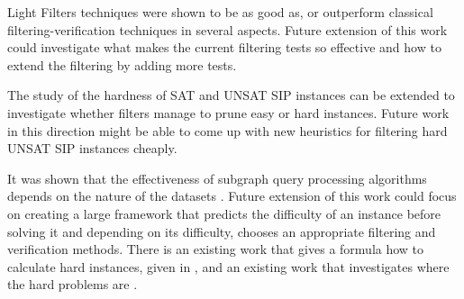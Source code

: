 \documentclass{l4proj}
\begin{document}
Light Filters techniques were shown to be as good as, or outperform classical filtering-verification techniques in several aspects. Future extension of this work could investigate what makes the current filtering tests so effective and how to extend the filtering by adding more tests.

The study of the hardness of SAT and UNSAT SIP instances can be extended to investigate whether filters manage to prune easy or hard instances. Future work in this direction might be able to come up with new heuristics for filtering hard UNSAT SIP instances cheaply.

It was shown that the effectiveness of subgraph query processing algorithms depends on the nature of the datasets \cite{CP2015}. Future extension of this work could focus on creating a large framework that predicts the difficulty of an instance before solving it and depending on its difficulty, chooses an appropriate filtering and verification methods. There is an existing work that gives a formula how to calculate hard instances, given in \cite{Gent:1996}, and an existing work that investigates where the hard problems are \cite{Cheeseman:1991}.





\printglossary
\printglossary[type=\acronymtype]
\end{document}
